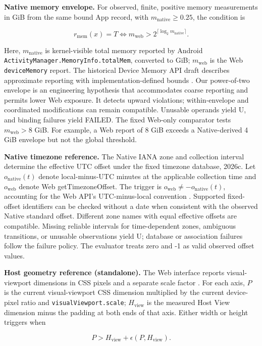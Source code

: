 \textbf{Native memory envelope.} For observed, finite, positive memory measurements in GiB from the same bound App record, with \(m_{\mathrm{native}} \ge 0.25\), the condition is

\[r_{\mathrm{mem}}(x)=T \iff m_{\mathrm{web}}>2^{\lceil\log_2 m_{\mathrm{native}}\rceil}.\]

Here, \(m_{\mathrm{native}}\) is kernel-visible total memory reported by Android \texttt{ActivityManager.MemoryInfo.totalMem}, converted to GiB; \(m_{\mathrm{web}}\) is the Web \texttt{deviceMemory} report. The historical Device Memory API draft describes approximate reporting with implementation-defined bounds \cite{ref13}. Our power-of-two envelope is an engineering hypothesis that accommodates coarse reporting and permits lower Web exposure. It detects upward violations; within-envelope and coordinated modifications can remain compatible. Unusable operands yield U, and binding failures yield FAILED. The fixed Web-only comparator tests \(m_{\mathrm{web}}>8\) GiB. For example, a Web report of 8 GiB exceeds a Native-derived 4 GiB envelope but not the global threshold.

\textbf{Native timezone reference.} The Native IANA zone and collection interval determine the effective UTC offset under the fixed timezone database, 2026c. Let \(o_{\mathrm{native}}(t)\) denote local-minus-UTC minutes at the applicable collection time and \(o_{\mathrm{web}}\) denote Web getTimezoneOffset. The trigger is \(o_{\mathrm{web}} \ne -o_{\mathrm{native}}(t)\), accounting for the Web API's UTC-minus-local convention \cite{ref14}. Supported fixed-offset identifiers can be checked without a date when consistent with the observed Native standard offset. Different zone names with equal effective offsets are compatible. Missing reliable intervals for time-dependent zones, ambiguous transitions, or unusable observations yield U; database or association failures follow the failure policy. The evaluator treats zero and -1 as valid observed offset values.

\textbf{Host geometry reference (standalone).} The Web interface reports visual-viewport dimensions in CSS pixels and a separate scale factor \cite{ref15}. For each axis, \(P\) is the current visual-viewport CSS dimension multiplied by the current device-pixel ratio and \texttt{visualViewport.scale}; \(H_{\mathrm{view}}\) is the measured Host View dimension minus the padding at both ends of that axis. Either width or height triggers when

\[P>H_{\mathrm{view}}+\epsilon(P,H_{\mathrm{view}}).\]

